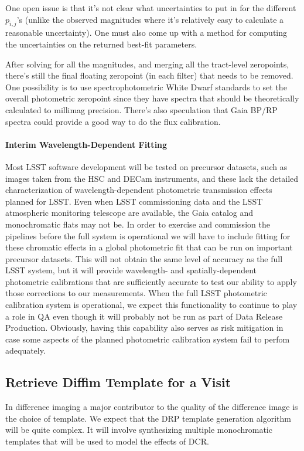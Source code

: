 One open issue is that it's not clear what uncertainties to put in for the different $p_{i,j}$'s (unlike the observed magnitudes where it's relatively easy to calculate a reasonable uncertainty). One must also come up with a method for computing the uncertainties on the returned best-fit parameters.

After solving for all the magnitudes, and merging all the tract-level zeropoints, there's still the final floating zeropoint (in each filter) that needs to be removed.  One possibility is to use spectrophotometric White Dwarf standards to set the overall photometric zeropoint since they have spectra that should be theoretically calculated to millimag precision.  There's also speculation that Gaia BP/RP spectra could provide a good way to do the flux calibration.

\paragraph{Interim Wavelength-Dependent Fitting}
\label{sec:acInterimPhotometricFit}

Most LSST software development will be tested on precursor datasets, such as images taken from the HSC and DECam instruments, and these lack the detailed characterization of wavelength-dependent photometric transmission effects planned for LSST.  Even when LSST commissioning data and the LSST atmospheric monitoring telescope are available, the Gaia catalog and monochromatic flats may not be.  In order to exercise and commission the pipelines before the full system is operational we will have to include fitting for these chromatic effects in a global photometric fit that can be run on important precursor datasets.  This will not obtain the same level of accuracy as the full LSST system, but it will provide wavelength- and spatially-dependent photometric calibrations that are sufficiently accurate to test our ability to apply those corrections to our measurements.  When the full LSST photometric calibration system is operational, we expect this functionality to continue to play a role in QA even though it will probably not be run as part of Data Release Production.  Obviously, having this capability also serves as risk mitigation in case some aspects of the planned photometric calibration system fail to perfom adequately.

\subsection{Retrieve Diffim Template for a Visit}
\label{sec:acRetrieveTemplate}
In difference imaging a major contributor to the quality of the difference image is the choice of template.  We expect that the DRP template generation algorithm will be quite complex.  It will involve synthesizing multiple monochromatic templates that will be used to model the effects of DCR.

